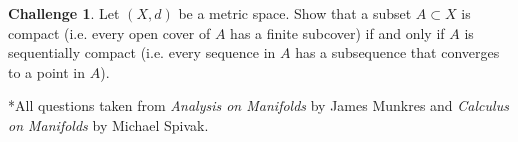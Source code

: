 \documentclass{amsart}
\newcommand{\+}[1]{\ensuremath{\mathbf{#1}}}
\theoremstyle{definition}
\newtheorem{chal}{Challenge}
\begin{document}
\vspace{5mm}
\begin{chal}
Let $(X,d)$ be a metric space.  Show that a subset $A \subset X$ is compact (i.e. every open cover of $A$
has a finite subcover) if and only if $A$ is sequentially compact (i.e. every sequence in $A$ has a subsequence
that converges to a point in $A$). 
\end{chal}

\vspace{5mm}

*All questions taken from \emph{Analysis on Manifolds} by James Munkres and \emph{Calculus on Manifolds} by Michael Spivak.
\end{document}
